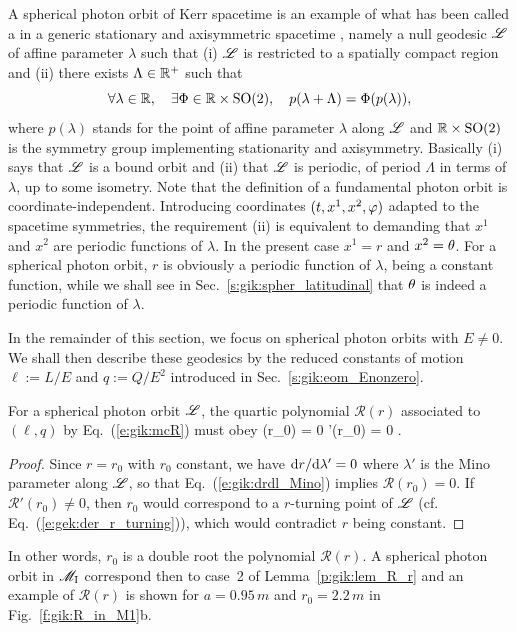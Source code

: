 \begin{remark}
A spherical photon orbit of Kerr spacetime is an example of what has been called
a  in a generic stationary and axisymmetric
spacetime \cite{CunhaH18,CunhaHR17}, namely a null geodesic $\mathscr{L}$ of affine
parameter $\lambda$ such
that (i) $\mathscr{L}$ is restricted to a spatially compact region and (ii) there exists
$\Lambda\in\mathbb{R}^+$ such that
\[
    \forall \lambda\in\mathbb{R}, \quad \exists \Phi\in \mathbb{R}\times\mathrm{SO}(2),
    \quad p(\lambda + \Lambda) = \Phi(p(\lambda)) ,
\]
where $p(\lambda)$ stands for the point of affine parameter $\lambda$ along $\mathscr{L}$
and $\mathbb{R}\times\mathrm{SO}(2)$ is the symmetry group implementing
stationarity and axisymmetry. Basically (i) says that $\mathscr{L}$ is a bound orbit
and (ii) that $\mathscr{L}$ is periodic, of period $\Lambda$ in terms of $\lambda$,
up to some isometry. Note that the definition of a fundamental photon orbit
is coordinate-independent. Introducing coordinates $(t,x^1,x^2,\varphi)$ adapted
to the spacetime symmetries, the requirement (ii) is equivalent to
demanding that $x^1$ and $x^2$ are periodic functions of $\lambda$. In the
present case $x^1 = r$ and $x^2 = \theta$. For a spherical photon orbit, $r$
is obviously a periodic function of $\lambda$, being a constant function, while
we shall see in Sec.~\ref{s:gik:spher_latitudinal} that $\theta$ is indeed
a periodic function of $\lambda$.
\end{remark}

In the remainder of this section, we focus on spherical photon orbits with $E\neq 0$.
We shall then describe these geodesics by the reduced constants of motion $\ell := L/E$
and $q := Q/E^2$ introduced in Sec.~\ref{s:gik:eom_Enonzero}.

For a spherical photon orbit $\mathscr{L}$,
the quartic polynomial $\mathcal{R}(r)$ associated to $(\ell,q)$ by Eq.~(\ref{e:gik:mcR})
must obey
\be \label{e:gik:R_Rp_r0_zero}
    (r_0) = 0 \qand {}'(r_0) = 0 .
\ee
\begin{proof}
Since $r=r_0$ with $r_0$ constant, we have $\mathrm{d} r/\mathrm{d}\lambda' = 0$ where $\lambda'$ is the Mino parameter along $\mathscr{L}$, so
that Eq.~(\ref{e:gik:drdl_Mino}) implies $\mathcal{R}(r_0) = 0$. If $\mathcal{R}'(r_0) \neq 0$,
then $r_0$ would correspond to a $r$-turning point of $\mathscr{L}$  (cf. Eq.~(\ref{e:gek:der_r_turning})),
which would contradict $r$ being constant.
\end{proof}
In other words, $r_0$ is a double root the polynomial $\mathcal{R}(r)$. A spherical
photon orbit in $\mathscr{M}_{\rm I}$ correspond then to case~2 of Lemma~\ref{p:gik:lem_R_r}
and an example of $\mathcal{R}(r)$ is shown
for $a=0.95\, m$ and $r_0=2.2\, m$ in Fig.~\ref{f:gik:R_in_M1}b.

